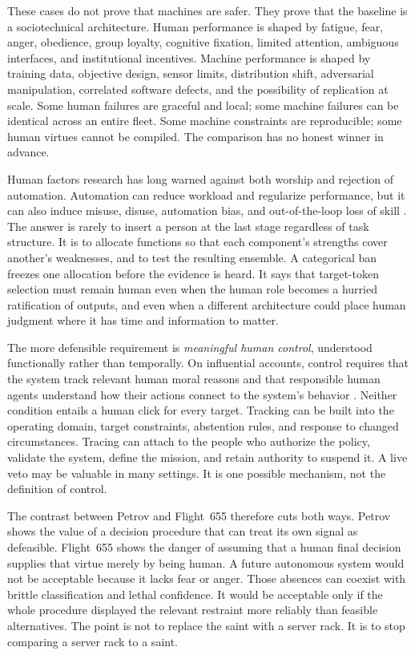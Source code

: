 \documentclass[11pt]{article}
\begin{document}
These cases do not prove that machines are safer. They prove that the baseline is a sociotechnical architecture. Human performance is shaped by fatigue, fear, anger, obedience, group loyalty, cognitive fixation, limited attention, ambiguous interfaces, and institutional incentives. Machine performance is shaped by training data, objective design, sensor limits, distribution shift, adversarial manipulation, correlated software defects, and the possibility of replication at scale. Some human failures are graceful and local; some machine failures can be identical across an entire fleet. Some machine constraints are reproducible; some human virtues cannot be compiled. The comparison has no honest winner in advance.

Human factors research has long warned against both worship and rejection of automation. Automation can reduce workload and regularize performance, but it can also induce misuse, disuse, automation bias, and out-of-the-loop loss of skill \citep{parasuraman1997}. The answer is rarely to insert a person at the last stage regardless of task structure. It is to allocate functions so that each component's strengths cover another's weaknesses, and to test the resulting ensemble. A categorical ban freezes one allocation before the evidence is heard. It says that target-token selection must remain human even when the human role becomes a hurried ratification of outputs, and even when a different architecture could place human judgment where it has time and information to matter.

The more defensible requirement is \emph{meaningful human control}, understood functionally rather than temporally. On influential accounts, control requires that the system track relevant human moral reasons and that responsible human agents understand how their actions connect to the system's behavior \citep{santoni2018, roff2016}. Neither condition entails a human click for every target. Tracking can be built into the operating domain, target constraints, abstention rules, and response to changed circumstances. Tracing can attach to the people who authorize the policy, validate the system, define the mission, and retain authority to suspend it. A live veto may be valuable in many settings. It is one possible mechanism, not the definition of control.

The contrast between Petrov and Flight~655 therefore cuts both ways. Petrov shows the value of a decision procedure that can treat its own signal as defeasible. Flight~655 shows the danger of assuming that a human final decision supplies that virtue merely by being human. A future autonomous system would not be acceptable because it lacks fear or anger. Those absences can coexist with brittle classification and lethal confidence. It would be acceptable only if the whole procedure displayed the relevant restraint more reliably than feasible alternatives. The point is not to replace the saint with a server rack. It is to stop comparing a server rack to a saint.
\end{document}
